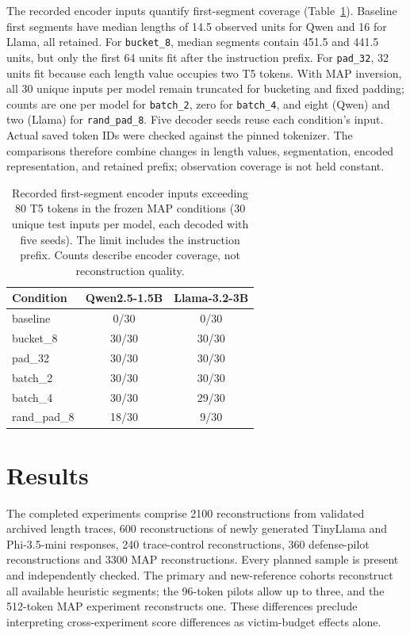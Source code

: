 \documentclass[electronics,article,submit,pdftex,moreauthors]{Definitions/mdpi}
\begin{document}
The recorded encoder inputs quantify first-segment coverage (Table~\ref{tab:encoder_coverage}). Baseline first segments have median lengths of 14.5 observed units for Qwen and 16 for Llama, all retained. For \texttt{bucket\_8}, median segments contain 451.5 and 441.5 units, but only the first 64 units fit after the instruction prefix. For \texttt{pad\_32}, 32 units fit because each length value occupies two T5 tokens. With MAP inversion, all 30 unique inputs per model remain truncated for bucketing and fixed padding; counts are one per model for \texttt{batch\_2}, zero for \texttt{batch\_4}, and eight (Qwen) and two (Llama) for \texttt{rand\_pad\_8}. Five decoder seeds reuse each condition's input. Actual saved token IDs were checked against the pinned tokenizer. The comparisons therefore combine changes in length values, segmentation, encoded representation, and retained prefix; observation coverage is not held constant.

\begin{table}[ht]
\centering
\caption{Recorded first-segment encoder inputs exceeding 80 T5 tokens in the frozen MAP conditions (30 unique test inputs per model, each decoded with five seeds). The limit includes the instruction prefix. Counts describe encoder coverage, not reconstruction quality.}
\label{tab:encoder_coverage}
\begin{tabular}{l c c}
\toprule
Condition & Qwen2.5-1.5B & Llama-3.2-3B \\
\midrule
baseline & 0/30 & 0/30 \\
bucket\_8 & 30/30 & 30/30 \\
pad\_32 & 30/30 & 30/30 \\
batch\_2 & 30/30 & 30/30 \\
batch\_4 & 30/30 & 29/30 \\
rand\_pad\_8 & 18/30 & 9/30 \\
\bottomrule
\end{tabular}
\end{table}

\section{Results}
The completed experiments comprise 2100 reconstructions from validated archived length traces, 600 reconstructions of newly generated TinyLlama and Phi-3.5-mini responses, 240 trace-control reconstructions, 360 defense-pilot reconstructions and 3300 MAP reconstructions. Every planned sample is present and independently checked. The primary and new-reference cohorts reconstruct all available heuristic segments; the 96-token pilots allow up to three, and the 512-token MAP experiment reconstructs one. These differences preclude interpreting cross-experiment score differences as victim-budget effects alone.
\end{document}
